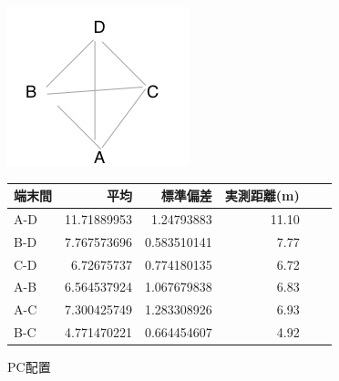\begin{figure}[p]
  \def\@captype{table}
  \begin{minipage}{0.3\hsize}
      \includegraphics[clip,width=1\hsize]{img/PC_haichi.png}
      \caption{PC配置}
      \label{fig:__relpos}
  \end{minipage}
  \hfill
  \begin{minipage}{0.68\hsize}
      \label{tab:__estdistance}
      \begin{tabular}{l|rrrrr}
        \hline
        {\footnotesize  端末間}&{\footnotesize 平均}&{\footnotesize 標準偏差}&{\footnotesize 実測距離(m) }\\
        \hline
        {\footnotesize A-D }&{\footnotesize 11.71889953}&{\footnotesize 1.24793883}&{\footnotesize 11.10 }\\
        {\footnotesize B-D }&{\footnotesize 7.767573696}&{\footnotesize 0.583510141}&{\footnotesize 7.77 }\\
        {\footnotesize C-D }&{\footnotesize 6.72675737}&{\footnotesize 0.774180135}&{\footnotesize 6.72 }\\
        {\footnotesize A-B }&{\footnotesize 6.564537924}&{\footnotesize 1.067679838}&{\footnotesize 6.83 }\\
        {\footnotesize A-C }&{\footnotesize 7.300425749}&{\footnotesize 1.283308926}&{\footnotesize 6.93 }\\
        {\footnotesize B-C }&{\footnotesize 4.771470221}&{\footnotesize 0.664454607}&{\footnotesize 4.92 }\\
        \hline
      \end{tabular}
  \end{minipage}
\end{figure}



